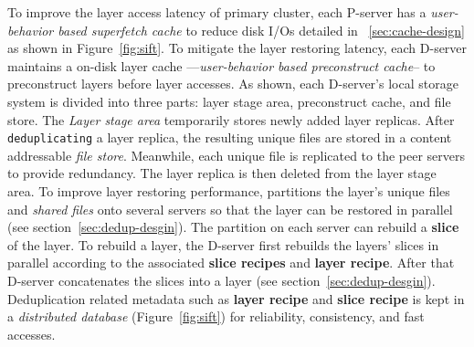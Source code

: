 To improve the layer access latency of 
primary cluster,
each P-server has a \emph{user-behavior based superfetch cache}
to reduce disk I/Os detailed in ~\ref{sec:cache-design} 
as shown in Figure~\ref{fig:sift}.
To mitigate the layer restoring latency,
each D-server maintains a on-disk layer cache ---\emph{user-behavior based preconstruct cache}--
to preconstruct layers before layer accesses.
As shown,
each D-server's local storage system is
divided into three parts: layer stage area, preconstruct cache, and file store.
%
%
The \emph{Layer stage area} temporarily stores newly added layer replicas.
After \texttt{deduplicating} a layer replica, 
the resulting unique files are stored in a content 
addressable \emph{file store}. 
Meanwhile, each unique file is replicated to the peer servers to provide redundancy.
The layer replica is then deleted from the layer stage area. 
%
To improve layer restoring performance, 
\sysname partitions the layer's unique files and \emph{shared files}
 onto several servers so that
the layer can be restored in parallel (see section~\ref{sec:dedup-desgin}).
The partition on each server 
can rebuild a \textbf{slice} of the layer. 
%
To rebuild a layer, 
the D-server first rebuilds the layers' slices in parallel 
according to the associated \textbf{slice recipes} and \textbf{layer recipe}.
After that D-server concatenates the slices into a layer (see section~\ref{sec:dedup-desgin}).
%
%
Deduplication related metadata such as \textbf{layer recipe} and \textbf{slice recipe}
is kept in a \emph{distributed database} (Figure~\ref{fig:sift})
for 
reliability, consistency, and fast accesses. 
  

